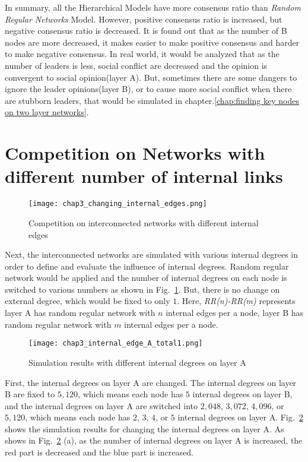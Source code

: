 In summary, all the Hierarchical Models have more consensus ratio than \textit{Random Regular Networks} Model. However, positive consensus ratio is increased, but negative consensus ratio is decreased. It is found out that as the number of B nodes are more decreased, it makes easier to make positive consensus and harder to make negative consensus. In real world, it would be analyzed that as the number of leaders is less, social conflict are decreased and the opinion is convergent to social opinion(layer A). But, sometimes there are some dangers to ignore the leader opinions(layer B), or to cause more social conflict when there are stubborn leaders, that would be simulated in chapter.\ref{chap:finding key nodes on two layer networks}. 

\section{Competition on Networks with different number of internal links}
\begin{figure}[!htb]
	\centering
	\texttt{[image: chap3\_changing\_internal\_edges.png]}
	\caption{Competition on interconnected networks with different internal edges}
	\label{chap3_changing_internal_edges}
\end{figure}
Next, the interconnected networks are simulated with various internal degrees in order to define and evaluate the influence of internal degrees. Random regular network would be applied and the number of internal degrees on each node is switched to various numbers as shown in Fig.~\ref{chap3_changing_internal_edges}. But, there is no change on external degree, which would be fixed to only $1$. Here, \textit{RR(n)-RR(m)} represents layer A has random regular network with $n$ internal edges per a node, layer B has random regular network with $m$ internal edges per a node.
\begin{figure}[!htb]
	\centering
	\texttt{[image: chap3\_internal\_edge\_A\_total1.png]}
	\caption{Simulation results with different internal degrees on layer A}
	\label{chap3_internal_edge_A_total}
\end{figure}
First, the internal degrees on layer A are changed. The internal degrees on layer B are fixed to $5,120$, which means each node has $5$ internal degrees on layer B, and the internal degrees on layer A are switched into $2,048$, $3,072$, $4,096$, or $5,120$, which means each node has $2$, $3$, $4$, or $5$ internal degrees on layer A. Fig.~\ref{chap3_internal_edge_A_total} shows the simulation results for changing the internal degrees on layer A. As shows in Fig.~\ref{chap3_internal_edge_A_total} (a), as the number of internal degrees on layer A is increased, the red part is decreased and the blue part is increased.  

